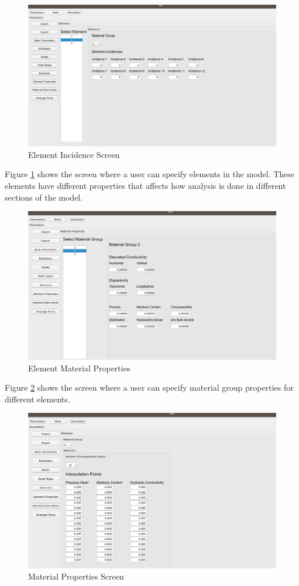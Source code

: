 \documentclass[onecolumn, draftclsnofoot,10pt, compsoc]{IEEEtran}
\begin{document}
\begin{figure}[H]
    \centering
    \includegraphics[scale=0.3]{element-incidence.png}
    \caption{Element Incidence Screen}
    \label{fig:element-incidence}
\end{figure}{}
Figure \ref{fig:element-incidence} shows the screen where a user can specify elements in the model. These elements have different properties that affects how analysis is done in different sections of the model. 
\begin{figure}[H]
    \centering
    \includegraphics[scale=0.3]{element-properties.png}
    \caption{Element Material Properties}
    \label{fig:element-properties}
\end{figure}{}
Figure \ref{fig:element-properties} shows the screen where a user can specify material group properties for different elements. 
\begin{figure}[H]
    \centering
    \includegraphics[scale=0.3]{material-properties.png}
    \caption{Material Properties Screen}
    \label{fig:material-properties}
\end{figure}{}
\end{document}
